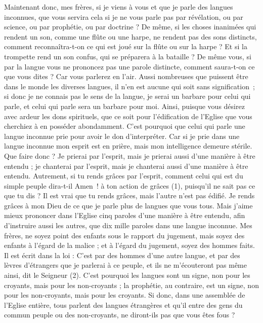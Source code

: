 \begin{multicols}{2}
Maintenant donc, mes frères, si je viens à vous et que je parle des langues inconnues, que vous servira cela si je ne vous parle pas par révélation, ou par science, ou par prophétie, ou par doctrine ?
De même, si les choses inanimées qui rendent un son, comme une flûte ou une harpe, ne rendent pas des sons distincts, comment reconnaîtra-t-on ce qui est joué sur la flûte ou sur la harpe ?
Et si la trompette rend un son confus, qui se préparera à la bataille ?
De même vous, si par la langue vous ne prononcez pas une parole distincte, comment saura-t-on ce que vous dites ? Car vous parlerez en l'air.
Aussi nombreuses que puissent être dans le monde les diverses langues, il n’en est aucune qui soit sans signification ;
si donc je ne connais pas le sens de la langue, je serai un barbare pour celui qui parle, et celui qui parle sera un barbare pour moi.
Ainsi, puisque vous désirez avec ardeur les dons spirituels, que ce soit pour l’édification de l'Eglise que vous cherchiez à en posséder abondamment.
C'est pourquoi que celui qui parle une langue inconnue prie pour avoir le don d’interpréter.
Car si je prie dans une langue inconnue mon esprit est en prière, mais mon intelligence demeure stérile.
Que faire donc ? Je prierai par l’esprit, mais je prierai aussi d'une manière à être entendu ; je chanterai par l’esprit, mais je chanterai aussi d'une manière à être entendu.
Autrement, si tu rends grâces par l’esprit, comment celui qui est du simple peuple dira-t-il Amen ! à ton action de grâces (1), puisqu'il ne sait pas ce que tu dis ?
Il est vrai que tu rends grâces, mais l’autre n’est pas édifié.
Je rends grâces à mon Dieu de ce que je parle plus de langues que vous tous.
Mais j'aime mieux prononcer dans l'Eglise cinq paroles d'une manière à être entendu, afin d’instruire aussi les autres, que dix mille paroles dans une langue inconnue.
Mes frères, ne soyez point des enfants sous le rapport du jugement, mais soyez des enfants à l’égard de la malice ; et à l'égard du jugement, soyez des hommes faits.
Il est écrit dans la loi : C’est par des hommes d’une autre langue, et par des lèvres d’étrangers que je parlerai à ce peuple, et ils ne m’écouteront pas même ainsi, dit le Seigneur (2).
C’est pourquoi les langues sont un signe, non pour les croyants, mais pour les non-croyants ; la prophétie, au contraire, est un signe, non pour les non-croyants, mais pour les croyants.
Si donc, dans une assemblée de l’Eglise entière, tous parlent des langues étrangères et qu'il entre des gens du commun peuple ou des non-croyants, ne diront-ils pas que vous êtes fous ?

\end{multicols}
